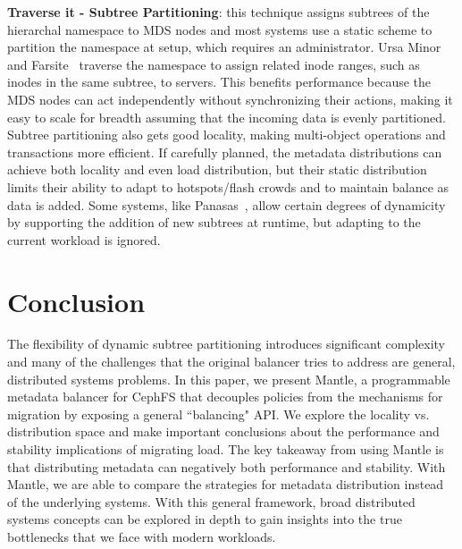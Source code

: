 \textbf{Traverse it - Subtree Partitioning}: this technique assigns subtrees of the hierarchal namespace to MDS nodes and most systems use a static scheme to partition the namespace at setup, which requires an administrator. Ursa Minor~\cite{sinnamohideen:atc2010-ursa} and Farsite~\cite{doucer:osdi2006-farsite-dir} traverse the namespace to assign related inode ranges, such as inodes in the same subtree, to servers. This benefits performance because the MDS nodes can act independently without synchronizing their actions, making it easy to scale for breadth assuming that the incoming data is evenly partitioned.  Subtree partitioning also gets good locality, making multi-object operations and transactions more efficient. If carefully planned, the metadata distributions can achieve both locality and even load distribution, but their static distribution limits their ability to adapt to hotspots/flash crowds and to maintain balance as data is added.  Some systems, like Panasas~\cite{welch:fast2008-panasas}, allow certain degrees of dynamicity by supporting the addition of new subtrees at runtime, but adapting to the current workload is ignored. 


\section{Conclusion}
The flexibility of dynamic subtree partitioning introduces significant complexity and many of the challenges that the original balancer tries to address are general, distributed systems problems. In this paper, we present Mantle, a programmable metadata balancer for CephFS that decouples policies from the mechanisms for migration by exposing a general ``balancing" API. We explore the locality vs. distribution space and make important conclusions about the performance and stability implications of migrating load. The key takeaway from using Mantle is that distributing metadata can negatively both performance and stability. With Mantle, we are able to compare the strategies for metadata distribution instead of the underlying systems. With this general framework, broad distributed systems concepts can be explored in depth to gain insights into the true bottlenecks that we face with modern workloads. 
